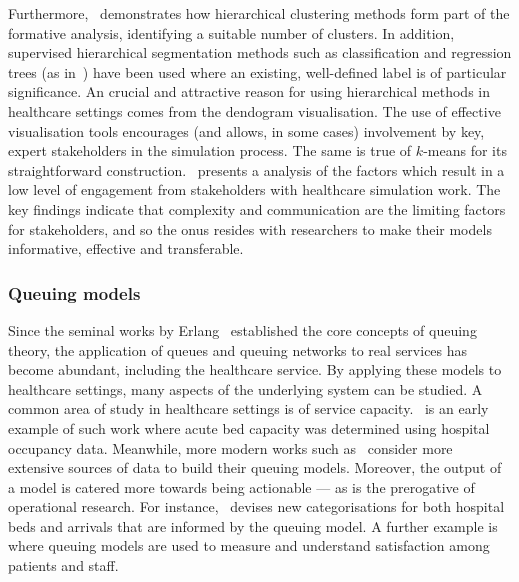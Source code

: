 Furthermore,~\cite{Vuik2016a} demonstrates how hierarchical clustering methods
form part of the formative analysis, identifying a suitable number of clusters.
In addition, supervised hierarchical segmentation methods such as classification
and regression trees (as in~\cite{Harper2006}) have been used where an existing,
well-defined label is of particular significance. An crucial and attractive
reason for using hierarchical methods in healthcare settings comes from the
dendogram visualisation. The use of effective visualisation tools encourages
(and allows, in some cases) involvement by key, expert stakeholders in the
simulation process. The same is true of \(k\)-means for its straightforward
construction.~\cite{Jahangirian2015} presents a analysis of the factors which
result in a low level of engagement from stakeholders with healthcare simulation
work. The key findings indicate that complexity and communication are the
limiting factors for stakeholders, and so the onus resides with researchers to
make their models informative, effective and transferable.


\subsubsection{Queuing models}

Since the seminal works by Erlang~\cite{Erlang1917,Erlang1920} established the
core concepts of queuing theory, the application of queues and queuing networks
to real services has become abundant, including the healthcare service. By
applying these models to healthcare settings, many aspects of the underlying
system can be studied. A common area of study in healthcare settings is of
service capacity.~\cite{McClain1976} is an early example of such work where
acute bed capacity was determined using hospital occupancy data. Meanwhile, more
modern works such as~\cite{Palvannan2012,Pinto2014} consider more extensive
sources of data to build their queuing models.  Moreover, the output of a model
is catered more towards being actionable --- as is the prerogative of
operational research. For instance,~\cite{Pinto2014} devises new categorisations
for both hospital beds and arrivals that are informed by the queuing model. A
further example is~\cite{Komashie2015} where queuing models are used to measure
and understand satisfaction among patients and staff.

